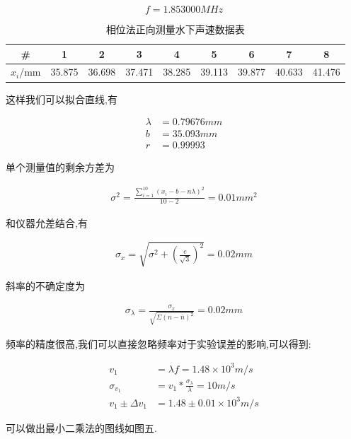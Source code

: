 \documentclass[a4paper,10pt,notitlepage]{article}
\begin{document}
\begin{equation}
	f = 1.853000 MHz
\end{equation}

\begin{table}[htbp]
\centering

	\begin{tabular}{|c|c|c|c|c|c|c|c|c|}
	\hline
	\# & 1 & 2 & 3 & 4 & 5 & 6 & 7 & 8 \\
	\hline
	$x_{i}$/mm & 35.875 & 36.698 & 37.471 & 38.285 & 39.113 & 39.877 & 40.633 & 41.476 \\
	\hline
	\end{tabular}
	\caption{相位法正向测量水下声速数据表}

\end{table}

	这样我们可以拟合直线,有
	
\begin{align}
	\lambda &= 0.79676mm \\
	b &= 35.093 mm \\
	r &= 0.99993
\end{align}

	单个测量值的剩余方差为
	
\begin{align}
	\sigma ^ 2 = \frac{\sum_{i = 1}^{10}(x_i - b - n\lambda )^2}{10 - 2} = 0.01 mm^2 
\end{align}

	和仪器允差结合,有
	
\begin{align}
	\sigma_x = \sqrt{\sigma^2 + (\frac{e}{\sqrt{3}})^2} = 0.02 mm 
\end{align}

	斜率的不确定度为
	
\begin{align}
	\sigma_{\lambda} = \frac{\sigma_x}{\sqrt{\Sigma(n - \bar{n})^2}} = 0.02mm
\end{align}

	频率的精度很高,我们可以直接忽略频率对于实验误差的影响,可以得到:
	
\begin{align}
	v_1 &= \lambda f = 1.48 \times 10^3 m/s \\
	\sigma_{v_1} &= v_1 * \frac{\sigma_{\lambda}}{\lambda} = 10m/s \\
	v_1 \pm \Delta v_1 &= 1.48 \pm 0.01 \times 10^3 m/s
\end{align}

	可以做出最小二乘法的图线如图五. \\
	
\end{document}
